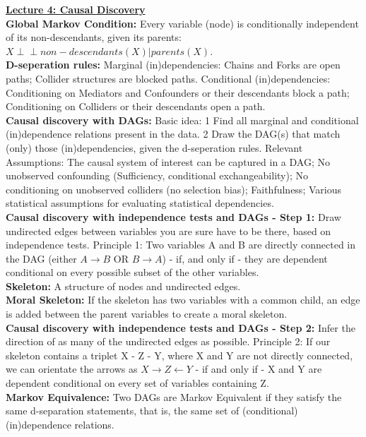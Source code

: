 \documentclass[a4paper,7pt,landscape]{extarticle}
\newcommand{\indep}{\perp \!\!\! \perp} %
\begin{document}
\begin{multicols}{3}
\begin{boxA}
\underline{\textbf{Lecture 4: Causal Discovery}}\\
\textbf{Global Markov Condition:} Every variable (node) is conditionally independent of its non-descendants, given its parents: $X \indep non-descendants(X) | parents(X)$.\\
\textbf{D-seperation rules:} Marginal (in)dependencies: Chains and Forks are open paths; Collider structures are blocked paths. Conditional (in)dependencies: Conditioning on Mediators and Confounders or their descendants block a path; Conditioning on Colliders or their descendants open a path.\\
\textbf{Causal discovery with DAGs:} Basic idea: 1 Find all marginal and conditional (in)dependence relations present in the data. 2 Draw the DAG(s) that match (only) those (in)dependencies, given the d-seperation rules. Relevant Assumptions: The causal system of interest can be captured in a DAG; No unobserved confounding (Sufficiency, conditional exchangeability); No conditioning on unobserved colliders (no selection bias); Faithfulness; Various statistical assumptions for evaluating statistical dependencies.\\
\textbf{Causal discovery with independence tests and DAGs - Step 1:} Draw undirected edges between variables you are sure have to be there, based on independence tests. Principle 1: Two variables A and B are directly connected in the DAG (either $A \rightarrow B$ OR $B \rightarrow A$) - if, and only if - they are dependent conditional on every possible subset of the other variables.\\
\textbf{Skeleton:} A structure of nodes and undirected edges.\\
\textbf{Moral Skeleton:} If the skeleton has two variables with a common child, an edge is added between the parent variables to create a moral skeleton.\\
\textbf{Causal discovery with independence tests and DAGs - Step 2:} Infer the direction of as many of the undirected edges as possible. Principle 2: If our skeleton contains a triplet X - Z - Y, where X and Y are not directly connected, we can orientate the arrows as $X \rightarrow Z \leftarrow Y$ - if and only if - X and Y are dependent conditional on every set of variables containing Z.\\
\textbf{Markov Equivalence:} Two DAGs are Markov Equivalent if they satisfy the same d-separation statements, that is, the same set of (conditional) (in)dependence relations.\\

\end{boxA}
\end{multicols}
\end{document}
